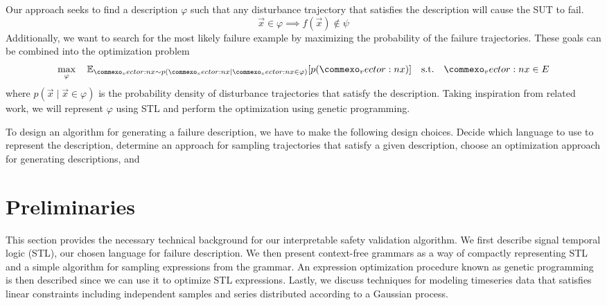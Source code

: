 
Our approach seeks to find a description $\varphi$ such that any disturbance trajectory that satisfies the description will cause the SUT to fail. 
\begin{equation}
    \vec{x} \in \varphi \implies f(\vec{x}) \not \in \psi
\end{equation}
Additionally, we want to search for the most likely failure example by maximizing the probability of the failure trajectories. These goals can be combined into the optimization problem 
\begin{equation}
\max_\varphi \quad \mathbb{E}_{\vec{x} \sim p(\vec{x} \mid \vec{x} \in \varphi)}[p(\vec{x})] \quad\textrm{s.t.}\quad \vec{x} \in E\\
\end{equation}
where $p(\vec{x} \mid \vec{x} \in \varphi)$ is the probability density of disturbance trajectories that satisfy the description. Taking inspiration from related work, we will represent $\varphi$ using STL and perform the optimization using genetic programming. 

To design an algorithm for generating a failure description, we have to make the following design choices. Decide which language to use to represent the description, determine an approach for sampling trajectories that satisfy a given description, choose an optimization approach for generating descriptions, and 


\section{Preliminaries}
This section provides the necessary technical background for our interpretable safety validation algorithm. We first describe signal temporal logic (STL), our chosen language for failure description. We then present context-free grammars as a way of compactly representing STL and a simple algorithm for sampling expressions from the grammar. An expression optimization procedure known as genetic programming is then described since we can use it to optimize STL expressions. Lastly, we discuss techniques for modeling timeseries data that satisfies linear constraints including independent samples and series distributed according to a Gaussian process. 

